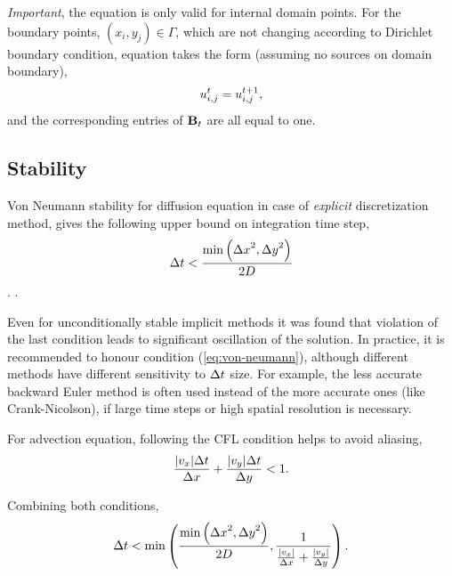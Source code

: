 \documentclass[]{article}
\begin{document}
\textit{Important}, the equation is only valid for internal domain points. For the boundary points, $(x_i,y_j) \in \Gamma$, which are not changing according to Dirichlet boundary condition, equation takes the form (assuming no sources on domain boundary),
\begin{equation}
u_{{i},{j}}^{t} = u_{{i},{j}}^{t+1},
\end{equation}
and the corresponding entries of ${\bf B}_t$ are all equal to one.

\subsection{Stability}
Von Neumann stability for diffusion equation in case of \textit{explicit} discretization method, gives the following upper bound on integration time step,
\begin{equation}
{\Delta{t}} < \frac{\min\left({\Delta{x}}^2, {\Delta{y}}^2\right)}{2 D}
\label{eq:von-neumann}
\end{equation}
. .

Even for unconditionally stable implicit methods it was found that violation of the last condition leads to significant oscillation of the solution. In practice, it is recommended to honour condition (\ref{eq:von-neumann}), although different methods have different sensitivity to ${\Delta{t}}$ size. For example, the less accurate backward Euler method is often used instead of the more accurate ones (like Crank-Nicolson), if large time steps or high spatial resolution is necessary. 

For advection equation, following the CFL condition helps to avoid aliasing,
\begin{equation}
\frac{|v_x| {\Delta{t}}}{{\Delta{x}}} + \frac{|v_y| {\Delta{t}}}{{\Delta{y}}} < 1.
\end{equation}

Combining both conditions,
\begin{equation}
{\Delta{t}} < \min\left(
\frac{\min\left({\Delta{x}}^2, {\Delta{y}}^2\right)}{2 D},
\frac{1}{\frac{|v_x|}{{\Delta{x}}} + \frac{|v_y|}{{\Delta{y}}}}
\right).
\end{equation}
\end{document}
